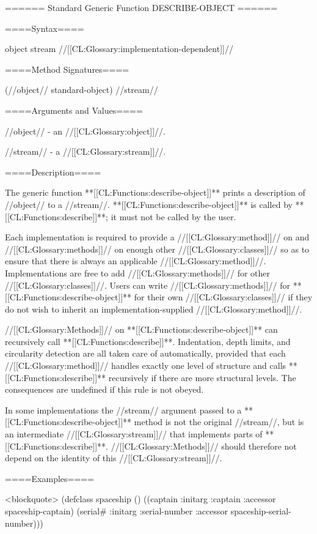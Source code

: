 ====== Standard Generic Function DESCRIBE-OBJECT ======


====Syntax====

 {object stream} {//[[CL:Glossary:implementation-dependent]]//}

====Method Signatures====

 {(//object// standard-object) //stream//}

====Arguments and Values====

//object// - an //[[CL:Glossary:object]]//.

//stream// - a //[[CL:Glossary:stream]]//.

====Description====

The generic function **[[CL:Functions:describe-object]]** prints a description of //object// to a //stream//. **[[CL:Functions:describe-object]]** is called by **[[CL:Functions:describe]]**; it must not be called by the user.


Each implementation is required to provide a //[[CL:Glossary:method]]// on  and //[[CL:Glossary:methods]]// on enough other //[[CL:Glossary:classes]]// so as to ensure that there is always an applicable //[[CL:Glossary:method]]//. Implementations are free to add //[[CL:Glossary:methods]]// for other //[[CL:Glossary:classes]]//. Users can write //[[CL:Glossary:methods]]// for **[[CL:Functions:describe-object]]** for their own //[[CL:Glossary:classes]]// if they do not wish to inherit an implementation-supplied //[[CL:Glossary:method]]//.

//[[CL:Glossary:Methods]]// on **[[CL:Functions:describe-object]]** can recursively call **[[CL:Functions:describe]]**. Indentation, depth limits, and circularity detection are all taken care of automatically, provided that each //[[CL:Glossary:method]]// handles exactly one level of structure and calls **[[CL:Functions:describe]]** recursively if there are more structural levels. The consequences are undefined if this rule is not obeyed.

In some implementations the //stream// argument passed to a **[[CL:Functions:describe-object]]** method is not the original //stream//, but is an intermediate //[[CL:Glossary:stream]]// that implements parts of **[[CL:Functions:describe]]**. //[[CL:Glossary:Methods]]// should therefore not depend on the identity of this //[[CL:Glossary:stream]]//.


====Examples====

<blockquote> (defclass spaceship () ((captain :initarg :captain :accessor spaceship-captain) (serial# :initarg :serial-number :accessor spaceship-serial-number)))

